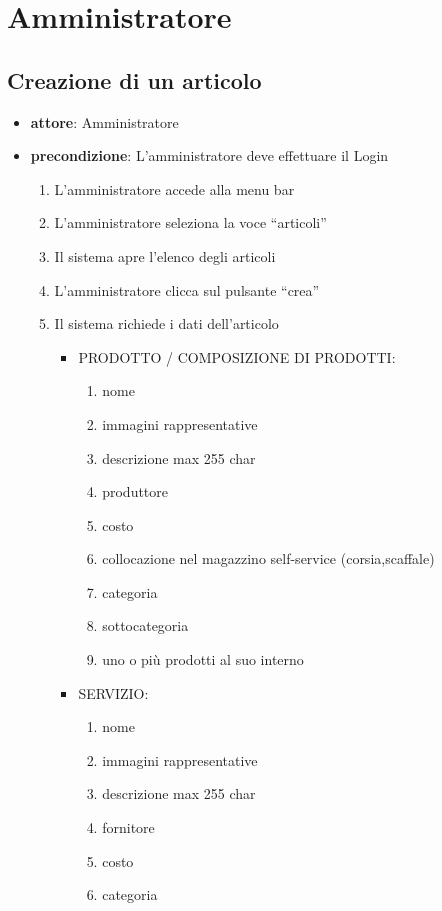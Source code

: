 \chapter{Amministratore}
		
\section{Creazione di un articolo}
\begin{itemize}
    \item \textbf{attore}: Amministratore
    \item \textbf{precondizione}: L’amministratore deve effettuare il Login
    
    \begin{enumerate}
        \item L’amministratore accede alla menu bar
        \label{itemCr1}
        \item L’amministratore seleziona la voce “articoli”
        \item Il sistema apre l’elenco degli articoli
        \item L’amministratore clicca sul pulsante “crea”
        \item Il sistema richiede i dati dell’articolo
    
		\begin{itemize}
        	\item PRODOTTO / COMPOSIZIONE DI PRODOTTI:
        	
			\begin{enumerate}
				\item nome
				\item immagini rappresentative
				\item descrizione max 255 char
				\item produttore
				\item costo
				\item collocazione nel magazzino self-service (corsia,scaffale)
				\item categoria
				\item sottocategoria
				\item uno o più prodotti al suo interno
			\end{enumerate}
		\end{itemize}

    
		\begin{itemize}
			\item SERVIZIO:
			
			\begin{enumerate}
				\item nome
    			\item immagini rappresentative
    			\item descrizione max 255 char
    			\item fornitore
    			\item costo
    			\item categoria
			\end{enumerate}
		\end{itemize}
    

\end{enumerate}
\end{itemize}
